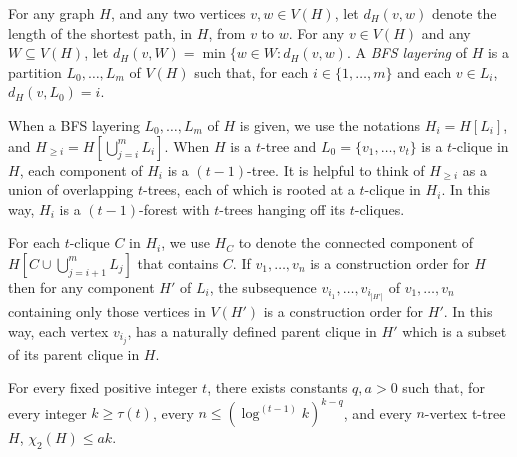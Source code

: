 \documentclass[kpfonts]{patmorin}
\newcommand{\uqs}{\chi_2}
\theoremstyle{named}
\begin{document}
For any graph $H$, and any two vertices $v,w\in V(H)$, let $d_H(v,w)$ denote the length of the shortest path, in $H$, from $v$ to $w$. For any $v\in V(H)$ and any $W\subseteq V(H)$, let $d_H(v,W)=\min\{w\in W: d_H(v,w)$. A \emph{BFS layering} of $H$ is a partition $L_0,\ldots,L_m$ of $V(H)$ such that, for each $i\in\{1,\ldots,m\}$ and each $v\in L_i$, $d_H(v,L_0)=i$.

When a BFS layering $L_0,\ldots,L_m$ of $H$ is given, we use the notations $H_i=H[L_i]$, and $H_{\ge i}=H[\bigcup_{j=i}^m L_i]$.  When $H$ is a $t$-tree and $L_0=\{v_1,\ldots,v_t\}$ is a $t$-clique in $H$, each component of $H_i$ is a $(t-1)$-tree.  It is helpful to think of $H_{\ge i}$ as a union of overlapping $t$-trees, each of which is rooted at a $t$-clique in $H_i$. In this way, $H_i$ is a $(t-1)$-forest with $t$-trees hanging off its $t$-cliques.

For each $t$-clique $C$ in $H_i$, we use $H_C$ to denote the connected component of $H[C\cup\bigcup_{j=i+1}^m L_j]$ that contains $C$.  If $v_1,\ldots,v_n$ is a construction order for $H$ then for any component $H'$ of $L_i$, the subsequence $v_{i_1},\ldots,v_{i_{|H'|}}$ of $v_1,\ldots,v_n$ containing only those vertices in $V(H')$ is a construction order for $H'$.  In this way, each vertex $v_{i_j}$, has a naturally defined parent clique in $H'$ which is a subset of its parent clique in $H$.




\begin{lem}\label{two-tree-technical}
    For every fixed positive integer $t$, there exists constants $q,a>0$ such that, for every integer $k\ge \tau(t)$, every $n\le (\log^{(t-1)} k)^{k-q}$, and every $n$-vertex t-tree $H$, $\uqs(H)\le ak$.
\end{lem}
\end{document}
